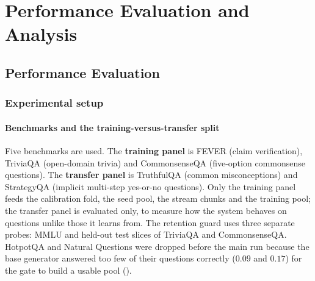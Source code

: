 
\chapter{Performance Evaluation and Analysis}
\label{ch:evaluation}


\section{Performance Evaluation}
\label{sec:performance}

\subsection{Experimental setup}
\label{sec:setup}

\subsubsection{Benchmarks and the training-versus-transfer split}
\label{sec:setup-benchmarks}

Five benchmarks are used. The \textbf{training panel} is FEVER \cite{thorne-etal-2018-fever} (claim verification), TriviaQA \cite{joshi-etal-2017-triviaqa} (open-domain trivia) and CommonsenseQA \cite{talmor-etal-2019-commonsenseqa} (five-option commonsense questions). The \textbf{transfer panel} is TruthfulQA \cite{lin-etal-2022-truthfulqa} (common misconceptions) and StrategyQA \cite{10.1162/tacl_a_00370} (implicit multi-step yes-or-no questions). Only the training panel feeds the calibration fold, the seed pool, the stream chunks and the training pool; the transfer panel is evaluated only, to measure how the system behaves on questions unlike those it learns from. The retention guard uses three separate probes: MMLU \cite{hendrycks2021measuring} and held-out test slices of TriviaQA and CommonsenseQA. HotpotQA and Natural Questions were dropped before the main run because the base generator answered too few of their questions correctly ($0.09$ and $0.17$) for the gate to build a usable pool ().

